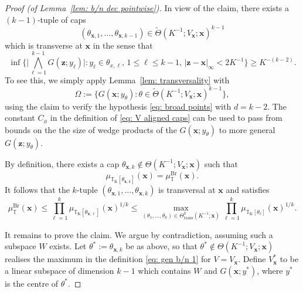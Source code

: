 \documentclass[10pt,a4paper]{amsart}
\newcommand{\T}{\mathbb{T}}
\newcommand{\bx}{\mathbf{x}}
\newcommand{\bz}{\mathbf{z}}
\newcommand{\trans}{\mathrm{trans}}
\begin{document}
\begin{proof}[Proof (of Lemma~\ref{lem: b/n dec pointwise})]
In view of the claim, there exists a $(k-1)$-tuple of caps 
\begin{equation*}
(\theta_{\bx,1}, \dots, \theta_{\bx,k-1}) \in \widetilde{\Theta}(K^{-1}; V_{\bx}; \bx)^{k-1}
\end{equation*}
which is transverse at $\bx$ in the sense that
\begin{equation*}
        \inf  \Big\{ \Big|\bigwedge_{\ell = 1}^{k-1} G(\bz;y_{\ell}) \Big| : y_{\ell} \in \theta_{x,\ell}, \, 1 \leq \ell \leq k -1, \, |\bz-\bx|_{\infty} < 2K^{-1} \Big\}\geq K^{-(k-2)}. 
\end{equation*}
To see this, we simply apply Lemma~\ref{lem: transversality} with
\begin{equation*}
    \Omega := \big\{G(\bx; y_{\theta}) : \theta \in \widetilde{\Theta}(K^{-1}; V_{\bx}; \bx)^{k-1}\big\},
\end{equation*}
using the claim to verify the hypothesis \eqref{eq: broad points} with $d=k-2$. The constant $C_{\phi}$ in the definition of \eqref{eq: V aligned caps} can be used to pass from bounds on the the size of wedge products of the $G(\bx; y_{\theta})$ to more general $G(\bz;y_{\theta})$. 

By definition, there exists a cap $\theta_{\bx, k} \notin \Theta(K^{-1}; V_{\bx}; \bx)$ such that 
\begin{equation*}
    \mu_{\T_{\mathrm{K}}[\theta_{\bx,k}]}(\bx) = \mu_{\T}^{\mathrm{Br}}(\bx).
\end{equation*}
It follows that the $k$-tuple $(\theta_{\bx,1}, \dots, \theta_{\bx, k})$ is transversal at $\bx$ and satisfies
\begin{equation*} 
    \mu_{\T}^{\mathrm{Br}}(\bx) \leq \prod_{\ell=1}^k \mu_{\T_{\mathrm{K}}[\theta_{\bx, \ell}]}(\bx)^{1/k} \leq \max_{(\theta_1, \dots, \theta_k) \in \Theta^k_{\trans}(K^{-1}; \bx)}  \prod_{\ell = 1}^k \mu_{\T_{\mathrm{K}}[\theta_{\ell}]}(\bx)^{1/k}.
\end{equation*}
\smallskip

It remains to prove the claim. We argue by contradiction, assuming such a subspace $W$ exists. Let $\theta^* := \theta_{\bx, k}$ be as above, so that $\theta^* \notin \Theta(K^{-1}; V_{\bx}; \bx)$ realises the maximum in the definition \eqref{eq: gen b/n 1} for $V = V_{\bx}$. Define $V_{\bx}^*$ to be a linear subspace of dimension $k-1$ which contains $W$ and $G(\bx; y^*)$, where $y^*$ is the centre of $\theta^*$.


\end{proof}
\end{document}

